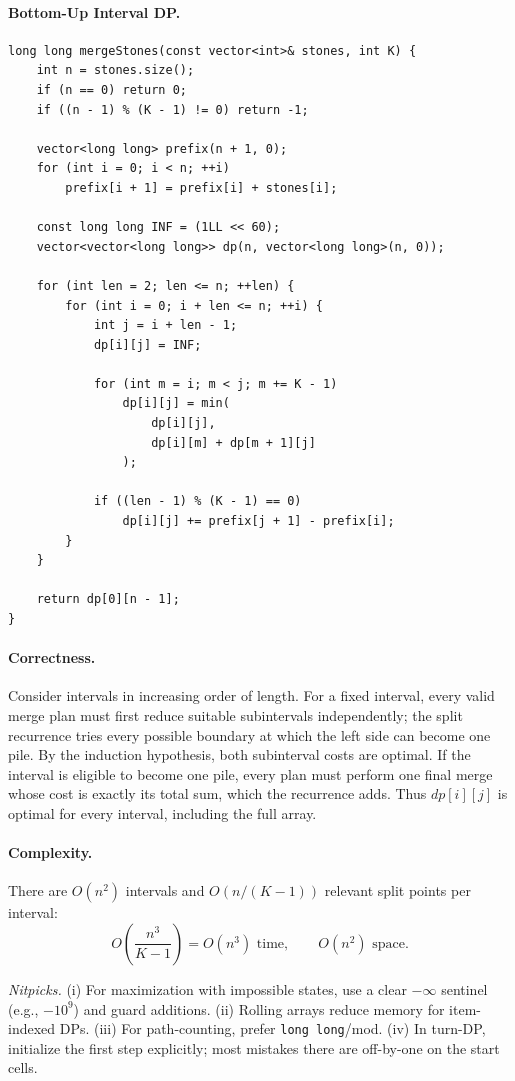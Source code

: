 \documentclass[9pt]{extarticle}
\begin{document}
\paragraph{Bottom-Up Interval DP.}
\begin{verbatim}
long long mergeStones(const vector<int>& stones, int K) {
    int n = stones.size();
    if (n == 0) return 0;
    if ((n - 1) % (K - 1) != 0) return -1;

    vector<long long> prefix(n + 1, 0);
    for (int i = 0; i < n; ++i)
        prefix[i + 1] = prefix[i] + stones[i];

    const long long INF = (1LL << 60);
    vector<vector<long long>> dp(n, vector<long long>(n, 0));

    for (int len = 2; len <= n; ++len) {
        for (int i = 0; i + len <= n; ++i) {
            int j = i + len - 1;
            dp[i][j] = INF;

            for (int m = i; m < j; m += K - 1)
                dp[i][j] = min(
                    dp[i][j],
                    dp[i][m] + dp[m + 1][j]
                );

            if ((len - 1) % (K - 1) == 0)
                dp[i][j] += prefix[j + 1] - prefix[i];
        }
    }

    return dp[0][n - 1];
}
\end{verbatim}

\paragraph{Correctness.}
Consider intervals in increasing order of length. For a fixed interval, every
valid merge plan must first reduce suitable subintervals independently; the
split recurrence tries every possible boundary at which the left side can
become one pile. By the induction hypothesis, both subinterval costs are
optimal. If the interval is eligible to become one pile, every plan must
perform one final merge whose cost is exactly its total sum, which the
recurrence adds. Thus \(dp[i][j]\) is optimal for every interval, including the
full array.

\paragraph{Complexity.}
There are \(O(n^2)\) intervals and \(O(n/(K-1))\) relevant split points per
interval:
\[
O\left(\frac{n^3}{K-1}\right)=O(n^3)\text{ time},
\qquad O(n^2)\text{ space}.
\]

\vspace{4pt}
\noindent\textit{Nitpicks.} 
(i) For maximization with impossible states, use a clear \(-\infty\) sentinel (e.g., \(-10^9\)) and guard additions. 
(ii) Rolling arrays reduce memory for item-indexed DPs. 
(iii) For path-counting, prefer \texttt{long long}/mod. 
(iv) In turn-DP, initialize the first step explicitly; most mistakes there are off-by-one on the start cells.
\end{document}
